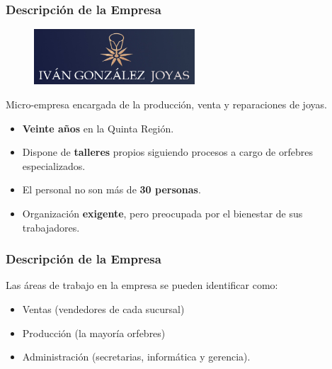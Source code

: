 \frame
{
\frametitle{Descripción de la Empresa}
\vspace{-1cm}
\begin{figure}[h!]
    \center
    \includegraphics[width=6cm]{img/joyeria_logo}
\end{figure}
\vspace{0.2cm}
Micro-empresa encargada de la producción, venta y reparaciones de joyas.
\begin{itemize}
    \item \textbf{Veinte años} en la Quinta Región.
    \item Dispone de \textbf{talleres} propios siguiendo procesos a cargo de orfebres especializados.
    \item El personal no son más de \textbf{30 personas}.
    \item Organización \textbf{exigente}, pero preocupada por el bienestar de sus trabajadores. 
\end{itemize}
}

\frame
{
\frametitle{Descripción de la Empresa}

Las áreas de trabajo en la empresa se pueden identificar como: 

\begin{itemize}
	\item Ventas (vendedores de cada sucursal)
	\item Producción (la mayoría orfebres)
	\item Administración (secretarias, informática y gerencia).
\end{itemize}

}

